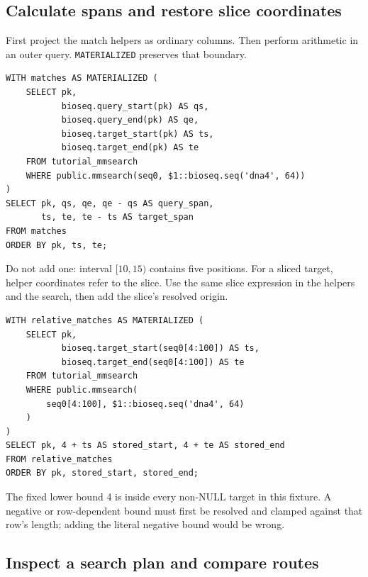\subsection{Calculate spans and restore slice coordinates}

First project the match helpers as ordinary columns. Then perform arithmetic
in an outer query. \texttt{MATERIALIZED} preserves that boundary.

\par\noindent\begin{minipage}{\linewidth}
\begin{lstlisting}[style=bioseq-appendix-sql]
WITH matches AS MATERIALIZED (
    SELECT pk,
           bioseq.query_start(pk) AS qs,
           bioseq.query_end(pk) AS qe,
           bioseq.target_start(pk) AS ts,
           bioseq.target_end(pk) AS te
    FROM tutorial_mmsearch
    WHERE public.mmsearch(seq0, $1::bioseq.seq('dna4', 64))
)
SELECT pk, qs, qe, qe - qs AS query_span,
       ts, te, te - ts AS target_span
FROM matches
ORDER BY pk, ts, te;
\end{lstlisting}
\end{minipage}

Do not add one: interval \([10,15)\) contains five positions. For a sliced
target, helper coordinates refer to the slice. Use the same slice expression
in the helpers and the search, then add the slice's resolved origin.

\par\noindent\begin{minipage}{\linewidth}
\begin{lstlisting}[style=bioseq-appendix-sql]
WITH relative_matches AS MATERIALIZED (
    SELECT pk,
           bioseq.target_start(seq0[4:100]) AS ts,
           bioseq.target_end(seq0[4:100]) AS te
    FROM tutorial_mmsearch
    WHERE public.mmsearch(
        seq0[4:100], $1::bioseq.seq('dna4', 64)
    )
)
SELECT pk, 4 + ts AS stored_start, 4 + te AS stored_end
FROM relative_matches
ORDER BY pk, stored_start, stored_end;
\end{lstlisting}
\end{minipage}

The fixed lower bound 4 is inside every non-NULL target in this fixture. A
negative or row-dependent bound must first be resolved and clamped against
that row's length; adding the literal negative bound would be wrong.

\subsection{Inspect a search plan and compare routes}

